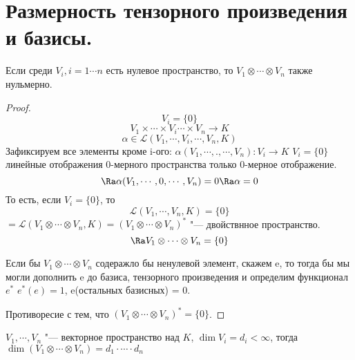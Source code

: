 ﻿\section{Размерность тензорного произведения и базисы.}

\begin{lemma}
Если среди $V_i,  i = 1 \cdots n$ есть нулевое пространство, 
то $V_1 \otimes \cdots \otimes V_n$  также нульмерно. 
\end{lemma}
\begin{proof}
    $$V_i = \{0\}$$
    $$V_1 \times \cdots \times V_i \cdots \times V_n \to K$$
    $$\alpha \in \mathcal{L}(V_1, \cdots, V_i, \cdots, V_n, K)$$
    Зафиксируем все элементы кроме i-ого: $\alpha(V_1, \cdots, ., \cdots, V_n) \colon V_i \to K$
    $V_i = \{0\}$ линейные отображения 0-мерного пространства только 0-мерное отображение. 
    $$\Ra \alpha(V_1, \cdots, 0, \cdots, V_n) = 0 \Ra \alpha = 0$$
    То есть, если $V_i = \{0\}$, то 
    $$\mathcal{L}(V_1, \cdots, V_n, K) = \{0\}$$
    $= \mathcal{L}(V_1 \otimes \cdots \otimes V_n, K) = (V_1 \otimes \cdots \otimes V_n)^*$ "--- двойствнное пространство. 
    $$\Ra V_1 \otimes \cdots \otimes V_n = \{0\}$$

    Если бы $V_1 \otimes \cdots \otimes V_n$ содеражло бы ненулевой элемент, скажем e, 
    то тогда бы мы могли дополнить e до базиса, тензорного произведения  и определим функционал $e^*$
    $e^*(e) = 1$, e(остальных базисных) = 0.

    Противоресие с тем, что $(V_1 \otimes \cdots \otimes V_n)^* = \{0\}$.
\end{proof}
\begin{theorem}
    $V_1, \cdots, V_n$ "--- векторное пространство над $K$, $\dim V_i = d_i < \infty$, 
    тогда $\dim(V_1 \otimes \cdots \otimes V_n) = d_1 \cdot \cdots \cdot d_n$
\end{theorem}
